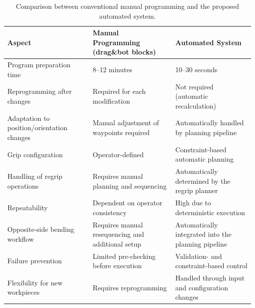 \begin{table}[htbp]
\centering
\normalsize
\begin{tabularx}{\textwidth}{
L{4.2cm}
L{5.2cm}
L{5.2cm}
}
\toprule
\textbf{Aspect} & 
\textbf{Manual Programming (drag\&bot blocks)} & 
\textbf{Automated System} \\
\midrule
 
Program preparation time & 
8--12 minutes & 
10--30 seconds \\
 
Reprogramming after changes & 
Required for each modification & 
Not required (automatic recalculation) \\
 
Adaptation to position/orientation changes & 
Manual adjustment of waypoints required & 
Automatically handled by planning pipeline \\
 
Grip configuration & 
Operator-defined & 
Constraint-based automatic planning \\
 
Handling of regrip operations & 
Requires manual planning and sequencing & 
Automatically determined by the regrip planner \\
 
Repeatability & 
Dependent on operator consistency & 
High due to deterministic execution \\
 
Opposite-side bending workflow & 
Requires manual resequencing and additional setup & 
Automatically integrated into the planning pipeline \\
 
Failure prevention & 
Limited pre-checking before execution & 
Validation- and constraint-based control \\
 
Flexibility for new workpieces & 
Requires reprogramming & 
Handled through input and configuration changes \\
 
\bottomrule
\end{tabularx}
\caption{Comparison between conventional manual programming and the proposed automated system.}
\label{tab:full_comparison}
\end{table}

\FloatBarrier

